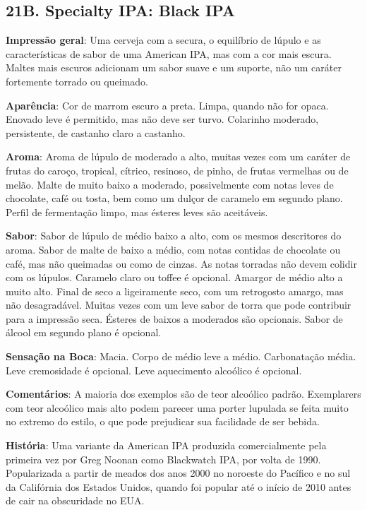 \subsection*{21B. Specialty IPA: Black IPA}

\textbf{Impressão geral}: Uma cerveja com a secura, o equilíbrio de lúpulo e as características de sabor de uma American IPA, mas com a cor mais escura. Maltes mais escuros adicionam um sabor suave e um suporte, não um caráter fortemente torrado ou queimado.

\textbf{Aparência}: Cor de marrom escuro a preta. Limpa, quando não for opaca. Enovado leve é permitido, mas não deve ser turvo. Colarinho moderado, persistente, de castanho claro a castanho.

\textbf{Aroma}: Aroma de lúpulo de moderado a alto, muitas vezes com um caráter de frutas do caroço, tropical, cítrico, resinoso, de pinho, de frutas vermelhas ou de melão. Malte de muito baixo a moderado, possivelmente com notas leves de chocolate, café ou tosta, bem como um dulçor de caramelo em segundo plano. Perfil de fermentação limpo, mas ésteres leves são aceitáveis.

\textbf{Sabor}: Sabor de lúpulo de médio baixo a alto, com os mesmos descritores do aroma. Sabor de malte de baixo a médio, com notas contidas de chocolate ou café, mas não queimadas ou como de cinzas. As notas torradas não devem colidir com os lúpulos. Caramelo claro ou toffee é opcional. Amargor de médio alto a muito alto. Final de seco a ligeiramente seco, com um retrogosto amargo, mas não desagradável. Muitas vezes com um leve sabor de torra que pode contribuir para a impressão seca. Ésteres de baixos a moderados são opcionais. Sabor de álcool em segundo plano é opcional.

\textbf{Sensação na Boca}: Macia. Corpo de médio leve a médio. Carbonatação média. Leve cremosidade é opcional. Leve aquecimento alcoólico é opcional.

\textbf{Comentários}: A maioria dos exemplos são de teor alcoólico padrão. Exemplarers com teor alcoólico mais alto podem parecer uma porter lupulada se feita muito no extremo do estilo, o que pode prejudicar sua facilidade de ser bebida.

\textbf{História}: Uma variante da American IPA produzida comercialmente pela primeira vez por Greg Noonan como Blackwatch IPA, por volta de 1990. Popularizada a partir de meados dos anos 2000 no noroeste do Pacífico e no sul da Califórnia dos Estados Unidos, quando foi popular até o início de 2010 antes de cair na obscuridade no EUA.

